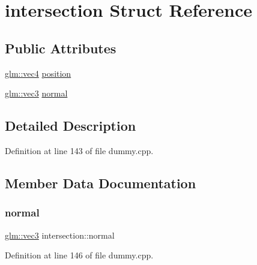 \hypertarget{structintersection}{}\section{intersection Struct Reference}
\label{structintersection}
\subsection*{Public Attributes}
\begin{DoxyCompactItemize}
\item 
\hyperlink{group__core__types_ga5881b1b022d7fd1b7218f5916532dd02}{glm\+::vec4} \hyperlink{structintersection_a7a33f425d759e3e1240499a7f527b914}{position}
\item 
\hyperlink{group__core__types_ga1c47e8b3386109bc992b6c48e91b0be7}{glm\+::vec3} \hyperlink{structintersection_a4db60aeaf032905a89ca8382914b44e4}{normal}
\end{DoxyCompactItemize}


\subsection{Detailed Description}


Definition at line 143 of file dummy.\+cpp.



\subsection{Member Data Documentation}
\mbox{\label{structintersection_a4db60aeaf032905a89ca8382914b44e4}} 
\subsubsection{\texorpdfstring{normal}{normal}}
{\footnotesize\ttfamily \hyperlink{group__core__types_ga1c47e8b3386109bc992b6c48e91b0be7}{glm\+::vec3} intersection\+::normal}



Definition at line 146 of file dummy.\+cpp.

\mbox{\label{structintersection_a7a33f425d759e3e1240499a7f527b914}} 
